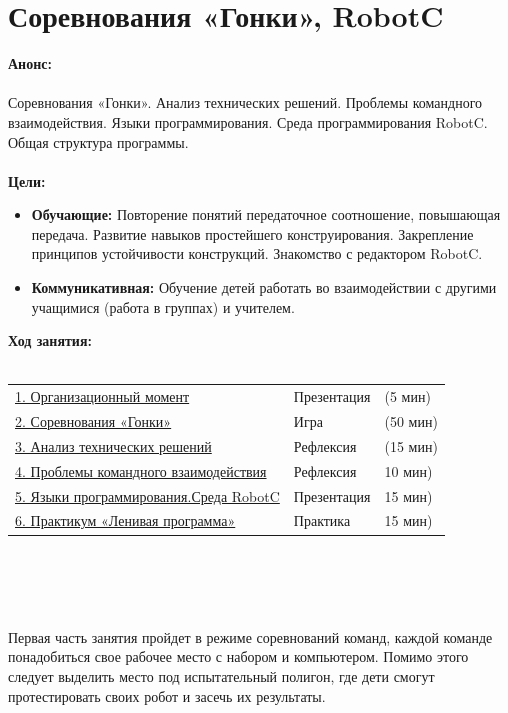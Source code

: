 \chapter{Соревнования  «Гонки», RobotC}
{\bfseries Анонс:}\\\\
Соревнования «Гонки». Анализ технических решений. Проблемы командного взаимодействия. Языки программирования. Среда программирования RobotC. Общая структура программы.\\\\
{\bfseries Цели:}
\begin{itemize}
	\item{}{\bfseries Обучающие:} Повторение понятий передаточное соотношение, повышающая передача. Развитие навыков простейшего конструирования. Закрепление  принципов устойчивости конструкций. Знакомство с редактором RobotC.
	\item{}{\bfseries Коммуникативная:} Обучение детей работать во взаимодействии с другими учащимися (работа в группах) и учителем.\\
\end{itemize}	
{\bfseries Ход занятия:}\\\\
\begin{tabular}{lll}
	\hyperlink{lesson9x1}{1. Организационный момент} & Презентация & (5 мин)\\
	\hyperlink{lesson9x2}{2. Соревнования «Гонки»} & Игра & (50 мин) \\
	\hyperlink{lesson9x3}{3. Анализ технических решений} & Рефлексия & (15 мин) \\
	\hyperlink{lesson9x4}{4. Проблемы командного взаимодействия} & Рефлексия & 10 мин)\\
	\hyperlink{lesson9x5}{5. Языки программирования.Среда RobotC} & Презентация & 15 мин)\\
	\hyperlink{lesson9x6}{6. Практикум «Ленивая программа»} & Практика & 15 мин)\\
\end{tabular}\\\\

{\hypertarget{lesson9x1}{}}\\\\ 

Первая часть занятия пройдет в режиме соревнований команд, каждой команде понадобиться свое рабочее место с набором и компьютером. Помимо этого следует выделить место под испытательный полигон, где дети смогут протестировать своих робот и засечь их результаты.

